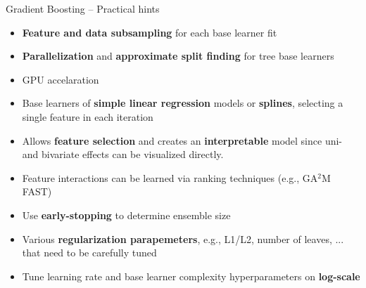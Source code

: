 \begin{frame}{Gradient Boosting -- Practical hints}

\footnotesize


\begin{itemize}
  \item \textbf{Feature and data subsampling} for each base learner fit
  \item \textbf{Parallelization} and \textbf{approximate split finding} for tree base learners
  \item GPU accelaration
\end{itemize}

\medskip

\begin{itemize}
    \item Base learners of \textbf{simple linear regression} models or \textbf{splines}, selecting a single feature in each iteration
    \item Allows \textbf{feature selection} and creates an \textbf{interpretable} model since uni- and bivariate effects can be visualized directly.
    \item Feature interactions can be learned via ranking techniques (e.g., GA$^2$M FAST)
\end{itemize}

\medskip

\begin{itemize}
    \item Use \textbf{early-stopping} to determine ensemble size
    \item Various \textbf{regularization parapemeters}, e.g., L1/L2, number of leaves, ... that need to be carefully tuned
    \item Tune learning rate and base learner complexity hyperparameters on \textbf{log-scale}
\end{itemize}

\end{frame}

